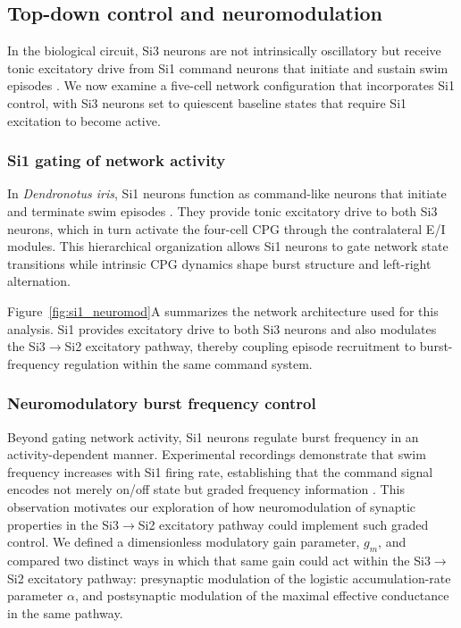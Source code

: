 \subsection{Top-down control and neuromodulation}

In the biological circuit, Si3 neurons are not intrinsically oscillatory but receive tonic excitatory drive from Si1 command neurons that initiate and sustain swim episodes \cite{sakurai2019command}.
We now examine a five-cell network configuration that incorporates Si1 control, with Si3 neurons set to quiescent baseline states that require Si1 excitation to become active.

\subsubsection{Si1 gating of network activity}

In \textit{Dendronotus iris}, Si1 neurons function as command-like neurons that initiate and terminate swim episodes \cite{sakurai2019command}.
They provide tonic excitatory drive to both Si3 neurons, which in turn activate the four-cell CPG through the contralateral E/I modules.
This hierarchical organization allows Si1 neurons to gate network state transitions while intrinsic CPG dynamics shape burst structure and left-right alternation.

Figure~\ref{fig:si1_neuromod}A summarizes the network architecture used for this analysis.
Si1 provides excitatory drive to both Si3 neurons and also modulates the Si3$\to$Si2 excitatory pathway, thereby coupling episode recruitment to burst-frequency regulation within the same command system.

\subsubsection{Neuromodulatory burst frequency control}

Beyond gating network activity, Si1 neurons regulate burst frequency in an activity-dependent manner.
Experimental recordings demonstrate that swim frequency increases with Si1 firing rate, establishing that the command signal encodes not merely on/off state but graded frequency information \cite{sakurai2019command}.
This observation motivates our exploration of how neuromodulation of synaptic properties in the Si3$\to$Si2 excitatory pathway could implement such graded control.
We defined a dimensionless modulatory gain parameter, $g_m$, and compared two distinct ways in which that same gain could act within the Si3$\to$Si2 excitatory pathway: presynaptic modulation of the logistic accumulation-rate parameter $\alpha$, and postsynaptic modulation of the maximal effective conductance in the same pathway.

